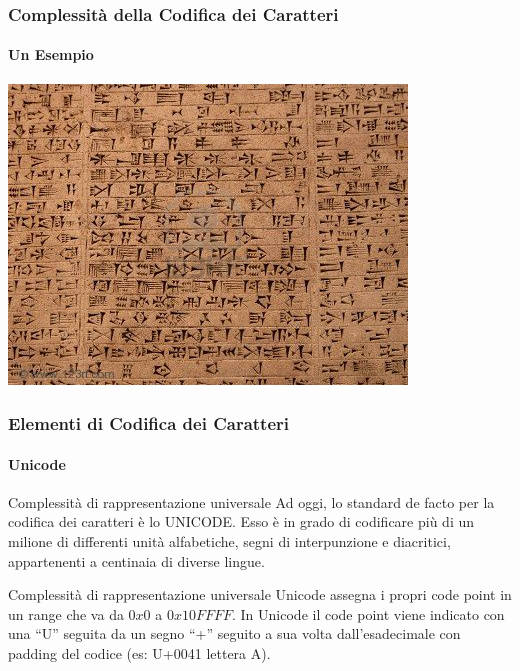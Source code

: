 \begin{frame}
	\frametitle{Complessità della Codifica dei Caratteri}
	\framesubtitle{Un Esempio}
	\addtocounter{nframe}{1}

	\begin{center}
		\includegraphics[width=.9\textwidth]{imgs/tavolettaArgilla.jpg}
	\end{center}

\end{frame}


\begin{frame}
	\frametitle{Elementi di Codifica dei Caratteri}
	\framesubtitle{Unicode}
	\addtocounter{nframe}{1}

	\begin{block}{Complessità di rappresentazione universale}
		Ad oggi, lo standard de facto per la codifica dei caratteri è lo UNICODE. Esso è in grado di codificare più di un milione di differenti unità alfabetiche, segni di interpunzione e diacritici, appartenenti a centinaia di diverse lingue.
	\end{block}

	\begin{block}{Complessità di rappresentazione universale}
		Unicode assegna i propri code point in un range che va da $0x0$ a $0x10FFFF$. In Unicode il code point viene  indicato con una ``U'' seguita da un segno ``+'' seguito a sua volta dall'esadecimale con padding del codice (es: U+0041 lettera A).
	\end{block}

\end{frame}

